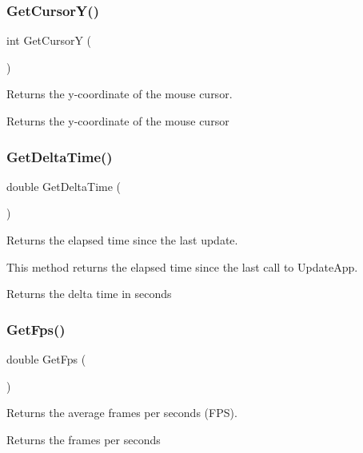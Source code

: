 \subsubsection{\texorpdfstring{Get\+Cursor\+Y()}{GetCursorY()}}
{\footnotesize\ttfamily int Get\+CursorY (\begin{DoxyParamCaption}{ }\end{DoxyParamCaption})}

Returns the y-\/coordinate of the mouse cursor.

\begin{DoxyReturn}{Returns}
the y-\/coordinate of the mouse cursor 
\end{DoxyReturn}
\mbox{\label{group__sdl__group_gaf9e3349b29171ad58521f5a7a6238fca}} 
\subsubsection{\texorpdfstring{Get\+Delta\+Time()}{GetDeltaTime()}}
{\footnotesize\ttfamily double Get\+Delta\+Time (\begin{DoxyParamCaption}{ }\end{DoxyParamCaption})}

Returns the elapsed time since the last update.

This method returns the elapsed time since the last call to Update\+App.

\begin{DoxyReturn}{Returns}
the delta time in seconds 
\end{DoxyReturn}
\mbox{\label{group__sdl__group_gaa48ddc248a57dfa1e4afdd6be2a76531}} 
\subsubsection{\texorpdfstring{Get\+Fps()}{GetFps()}}
{\footnotesize\ttfamily double Get\+Fps (\begin{DoxyParamCaption}{ }\end{DoxyParamCaption})}

Returns the average frames per seconds (F\+PS).

\begin{DoxyReturn}{Returns}
the frames per seconds 
\end{DoxyReturn}
\mbox{\label{group__sdl__group_ga236d5b80ee4ca0a1abe0ae054f7fbe2f}} 
